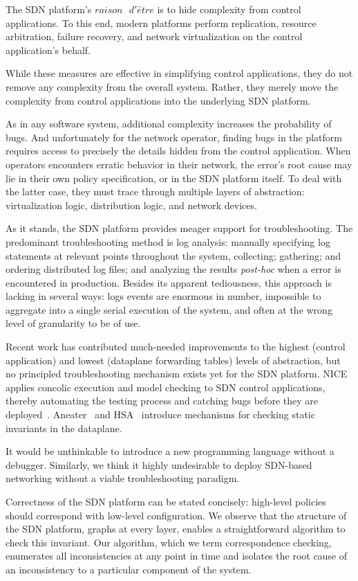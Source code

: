 The SDN platform's $raison\text{ }d'\hat{e}tre$ is to 
hide complexity from control applications. To this end, modern platforms perform
replication, resource arbitration, failure recovery, and network 
virtualization on the control application's behalf. 

While these measures are effective in simplifying control applications,
they do not remove any complexity from the overall system. Rather, they merely move the complexity
from control applications into the underlying SDN platform.

As in any software system, additional complexity increases the probability of
bugs. And unfortunately for the network operator, finding bugs in the platform requires
access to precisely the details hidden from the control application.
When operators encounters erratic behavior in their network, the error's root
cause may lie in their own policy specification, or in the SDN platform
itself. To deal with the latter case, they must trace through
multiple layers of abstraction: virtualization logic, distribution logic, and
network devices.

As it stands, the SDN platform provides meager support for troubleshooting.
The predominant troubleshooting method is log analysis: manually
specifying log statements at relevant points throughout the system,
collecting; gathering; and ordering distributed log files; and analyzing the
results {\it post-hoc} when a error is encountered in production. Besides its
apparent tediousness, this approach is lacking in several ways: logs events
are enormous in number, impossible to aggregate into a single serial
execution of the system, and often at the wrong level of granularity to be of
use.

Recent work has contributed much-needed improvements to the highest (control
application) and lowest (dataplane forwarding tables) levels of abstraction, 
but no principled troubleshooting mechanism exists yet for the SDN platform.
NICE applies concolic execution and model checking to SDN control
applications, thereby automating the testing process and catching bugs before
they are deployed~\cite{nice}. Aneater~\cite{anteater} and HSA~\cite{hsa}
introduce mechanisms for checking static invariants in the dataplane.

It would be unthinkable to introduce a new programming language without a
debugger. Similarly, we think it highly undesirable to deploy SDN-based
networking without a viable troubleshooting paradigm. 

Correctness of the SDN platform can be stated concisely: high-level policies
should correspond with low-level configuration. We observe that the structure
of the SDN platform, graphs at every layer, enables a straightforward
algorithm to check this invariant. Our algorithm, which we term correspondence checking,
enumerates all inconsistencies at any point in time and isolates the
root cause of an inconsistency to a particular component of the system.

